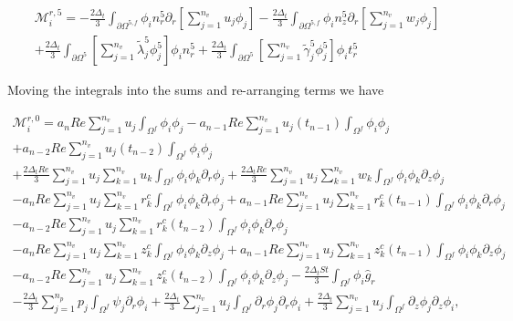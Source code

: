 \documentclass{article}
\begin{document}
\begin{equation}
\begin{array}{l} \mathcal{M}_i^{r,5} = -\frac{2\Delta_t}{3} \int_{\partial \Omega^{5,f}} \phi_i n_r^5 \partial_r \left[ \sum_{j=1}^{n_v} u_j \phi_j \right] - \frac{2\Delta_t}{3} \int_{\partial \Omega^{5,f}} \phi_i n_z^5 \partial_r \left[ \sum_{j=1}^{n_v} w_j \phi_j \right] \\ + \frac{2\Delta_t}{3} \int_{\partial \Omega^{5}} \left[ \sum_{j=1}^{n_v} \tilde{\lambda}_j^5 \phi_j^5 \right] \phi_i n_r^5 + \frac{2\Delta_t}{3} \int_{\partial \Omega^{5}} \left[ \sum_{j=1}^{n_v} \tilde{\gamma}_j^5 \phi_j^5 \right] \phi_i t_r^5 \end{array} \tag{4.86}
\end{equation}

Moving the integrals into the sums and re-arranging terms we have

\begin{equation}
\begin{array}{l} \mathcal{M}_i^{r,0} = a_n Re \sum_{j=1}^{n_v} u_j \int_{\Omega^f} \phi_i \phi_j - a_{n-1} Re \sum_{j=1}^{n_v} u_j(t_{n-1}) \int_{\Omega^f} \phi_i \phi_j \\ + a_{n-2} Re \sum_{j=1}^{n_v} u_j(t_{n-2}) \int_{\Omega^f} \phi_i \phi_j \\ + \frac{2\Delta_t Re}{3} \sum_{j=1}^{n_v} u_j \sum_{k=1}^{n_v} u_k \int_{\Omega^f} \phi_i \phi_k \partial_r \phi_j + \frac{2\Delta_t Re}{3} \sum_{j=1}^{n_v} u_j \sum_{k=1}^{n_v} w_k \int_{\Omega^f} \phi_i \phi_k \partial_z \phi_j \\ - a_n Re \sum_{j=1}^{n_v} u_j \sum_{k=1}^{n_v} r_k^c \int_{\Omega^f} \phi_i \phi_k \partial_r \phi_j + a_{n-1} Re \sum_{j=1}^{n_v} u_j \sum_{k=1}^{n_v} r_k^c(t_{n-1}) \int_{\Omega^f} \phi_i \phi_k \partial_r \phi_j \\ - a_{n-2} Re \sum_{j=1}^{n_v} u_j \sum_{k=1}^{n_v} r_k^c(t_{n-2}) \int_{\Omega^f} \phi_i \phi_k \partial_r \phi_j \\ - a_n Re \sum_{j=1}^{n_v} u_j \sum_{k=1}^{n_v} z_k^c \int_{\Omega^f} \phi_i \phi_k \partial_z \phi_j + a_{n-1} Re \sum_{j=1}^{n_v} u_j \sum_{k=1}^{n_v} z_k^c(t_{n-1}) \int_{\Omega^f} \phi_i \phi_k \partial_z \phi_j \\ - a_{n-2} Re \sum_{j=1}^{n_v} u_j \sum_{k=1}^{n_v} z_k^c(t_{n-2}) \int_{\Omega^f} \phi_i \phi_k \partial_z \phi_j - \frac{2\Delta_t St}{3} \int_{\Omega^f} \phi_i \hat{g}_r \\ - \frac{2\Delta_t}{3} \sum_{j=1}^{n_p} p_j \int_{\Omega^f} \psi_j \partial_r \phi_i + \frac{2\Delta_t}{3} \sum_{j=1}^{n_v} u_j \int_{\Omega^f} \partial_r \phi_j \partial_r \phi_i + \frac{2\Delta_t}{3} \sum_{j=1}^{n_v} u_j \int_{\Omega^f} \partial_z \phi_j \partial_z \phi_i, \end{array} \tag{4.87}
\end{equation}
\end{document}
